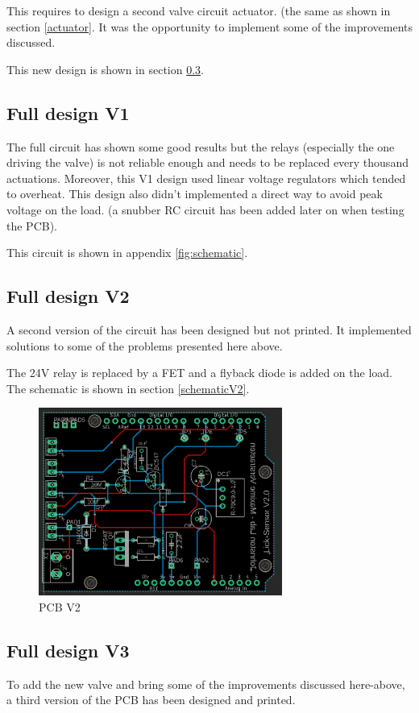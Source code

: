 \documentclass[a4paper]{article}
\begin{document}
This requires to design a second valve circuit actuator. (the same as shown in section \ref{actuator}.
It was the opportunity to implement some of the improvements discussed.

This new design is shown in section \ref{designV3}.

\subsection{Full design V1}
The full circuit has shown some good results but the relays (especially the one driving the valve) is not reliable enough and needs to be replaced every thousand actuations. 
Moreover, this V1 design used linear voltage regulators which tended to overheat.
This design also didn't implemented a direct way to avoid peak voltage on the load. (a snubber RC circuit has been added later on when testing the PCB).

This circuit is shown in appendix \ref{fig:schematic}.

\subsection{Full design V2}
A second version of the circuit has been designed but not printed. It implemented solutions to some of the problems presented here above.

The 24V relay is replaced by a FET and a flyback diode is added on the load.
The schematic is shown in section \ref{schematicV2}.

\begin{figure}[h!t!b!]
    \centering
    \includegraphics[width = 8cm]{images/schematicV2.PNG}
    \caption{PCB V2}
    \label{fig:PCBV2}
\end{figure}

\subsection{Full design V3}
\label{designV3}
To add the new valve and bring some of the improvements discussed here-above, a third version of the PCB has been designed and printed.
\end{document}
